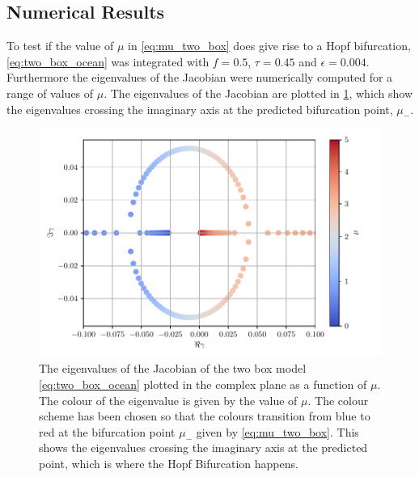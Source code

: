 \subsection{Numerical Results}
To test if the value of $\mu$ in \cref{eq:mu_two_box} does give rise to a Hopf bifurcation, \cref{eq:two_box_ocean} was integrated with $f = 0.5$, $\tau = 0.45$ and $\epsilon = 0.004$.
Furthermore the eigenvalues of the Jacobian were numerically computed for a range of values of $\mu$. The eigenvalues of the Jacobian are plotted in \cref{fig:eigen_values_of_the_jacobian},
which show the eigenvalues crossing the imaginary axis at the predicted bifurcation point, $\mu_-$.
\begin{figure}
  \centering
  \includegraphics[width=\textwidth,keepaspectratio]{complex_plane_two_box_eig}
  \caption[Eigenvalues of the two box Jacobian]{The eigenvalues of the Jacobian of the two box model \cref{eq:two_box_ocean} plotted in the complex plane as a
    function of $\mu$.  The colour of the eigenvalue is given
    by the value of $\mu$. The colour scheme has been chosen so that the colours transition from blue to red at the bifurcation point $\mu_-$ given by
  \cref{eq:mu_two_box}. This shows the eigenvalues crossing the imaginary axis at the predicted point, which is where the Hopf Bifurcation happens.}
  \label{fig:eigen_values_of_the_jacobian}
\end{figure}
